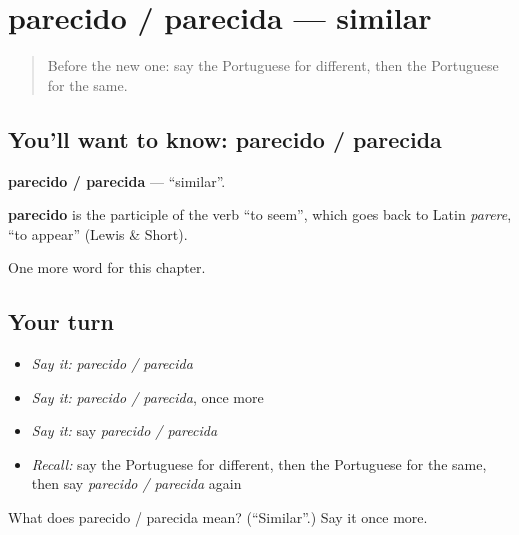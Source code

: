 \section[parecido / parecida]{parecido / parecida — similar}

\label{lesson:PT-C186-parecido-parecida}



\begin{quote}
Before the new one: say the Portuguese for different, then the Portuguese for the same.
\end{quote}

\subsection*{You'll want to know: parecido / parecida}
\textbf{parecido / parecida} — \textquotedblleft{}similar\textquotedblright{}.

\begin{cousinweb}
\textbf{parecido} is the participle of the verb \textquotedblleft{}to seem\textquotedblright{}, which goes back to Latin \emph{parere}, \textquotedblleft{}to appear\textquotedblright{} (Lewis \& Short).
\end{cousinweb}

\begin{grammarlens}[title={What you've built}]
One more word for this chapter.
\end{grammarlens}

\subsection*{Your turn}
\begin{itemize}
\raggedright
  \item \emph{Say it:} \emph{parecido / parecida}
  \item \emph{Say it:} \emph{parecido / parecida}, once more
  \item \emph{Say it:} say \emph{parecido / parecida}
  \item \emph{Recall:} say the Portuguese for different, then the Portuguese for the same, then say \emph{parecido / parecida} again
\end{itemize}

\begin{tcolorbox}[breakable,colback=teal!4,colframe=teal!35!black,title={Before you move on}]
What does parecido / parecida mean? (\textquotedblleft{}Similar\textquotedblright{}.) Say it once more.
\end{tcolorbox}
